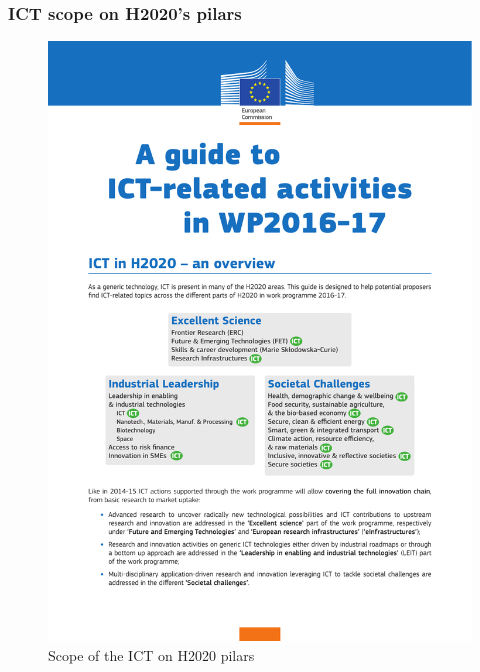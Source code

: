 \documentclass[compress,9pt,xcolor={dvipsnames,table}]{beamer}
\begin{document}
\begin{frame}\frametitle{ICT scope on H2020's pilars}
\begin{figure}[tb]
  \centering
  \includegraphics[width=\textwidth]{images/ict-scope}
  \caption{Scope of the ICT on H2020 pilars}
  \label{fig:ict-scope}
\end{figure}

\end{frame}
\end{document}
